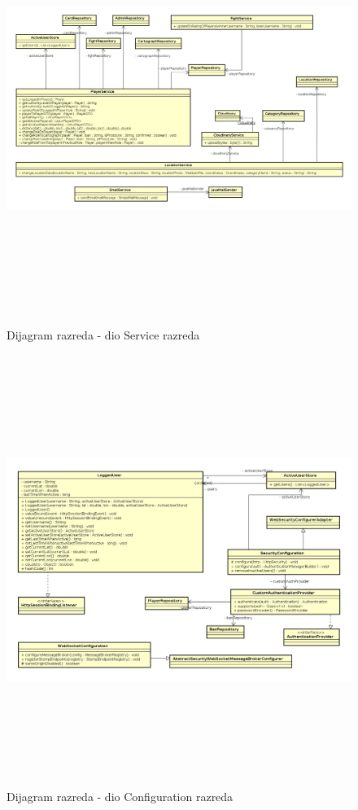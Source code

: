 			\begin{figure}[H]
				\includegraphics[width=\linewidth, height=14cm]{dijagrami/service_diagram}				
				\centering
				\caption{Dijagram razreda - dio Service razreda}
				\label{}
			\end{figure}
		
			\begin{figure}[H]
				\includegraphics[width=\linewidth, height=14cm]{dijagrami/configuration_diagram}				
				\centering
				\caption{Dijagram razreda - dio Configuration razreda}
				\label{}
			\end{figure}
			
